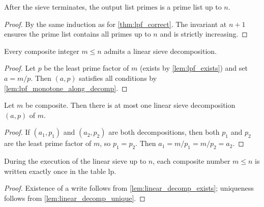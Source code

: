 \begin{theorem}
    \label{thm:prime_list_correct}
    After the sieve terminates, the output list $\mathrm{primes}$ is a prime list up to $n$.
\end{theorem}
\begin{proof}
    By the same induction as for \ref{thm:lpf_correct}. The invariant at $n+1$ ensures the prime list contains all primes up to $n$ and is strictly increasing.
\end{proof}

\begin{lemma}
    \label{lem:linear_decomp_exists}
    Every composite integer $m\le n$ admits a linear sieve decomposition.
\end{lemma}
\begin{proof}
    Let $p$ be the least prime factor of $m$ (exists by \ref{lem:lpf_exists}) and set $a = m/p$. Then $(a,p)$ satisfies all conditions by \ref{lem:lpf_monotone_along_decomp}.
\end{proof}

\begin{lemma}
    \label{lem:linear_decomp_unique}
    Let $m$ be composite.
    Then there is at most one linear sieve decomposition $(a,p)$ of $m$.
\end{lemma}
\begin{proof}
    If $(a_1, p_1)$ and $(a_2, p_2)$ are both decompositions, then both $p_1$ and $p_2$ are the least prime factor of $m$, so $p_1 = p_2$. Then $a_1 = m/p_1 = m/p_2 = a_2$.
\end{proof}

\begin{theorem}
    \label{thm:every_composite_once}
    During the execution of the linear sieve up to $n$, each composite number $m\le n$ is written exactly once in the table $\mathrm{lp}$.
\end{theorem}
\begin{proof}
    Existence of a write follows from \ref{lem:linear_decomp_exists}; uniqueness follows from \ref{lem:linear_decomp_unique}.
\end{proof}

